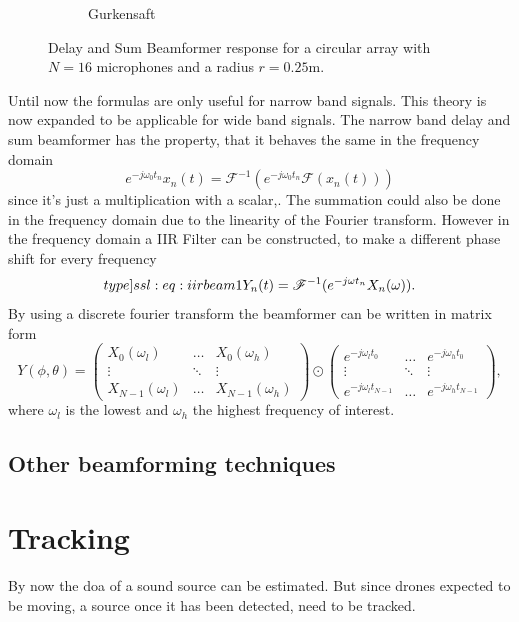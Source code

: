 \begin{figure}[h]
\begin{subfigure}[t]{0.45\textwidth}
		\caption{Gurkensaft} 
		\label{ssl:fig:f_dep1}
	\end{subfigure}
	\caption{Delay and Sum Beamformer response for a circular array with $N=16$ microphones 
	and a radius $r = 0.25$m. }
	\label{ssl:fig:f_deps}
\end{figure}


Until now the formulas are only useful for narrow band signals. 
This theory is now expanded to be applicable for wide band signals.
The narrow band delay and sum beamformer has the property, that it behaves
the same in the frequency domain
\begin{equation}
	e^{-j\omega_0 t_n} x_n(t) = \mathscr{F}^{-1}(e^{-j\omega_0 t_n} \mathscr{F}(x_n(t)))
\end{equation}
since it's just a multiplication with a scalar,. 
The summation could also be done in the frequency domain due to the 
linearity of the Fourier transform.
However in the frequency domain a IIR Filter can be constructed, to 
make a different phase shift for every frequency 
\begin{equation}
	\label[type]{ssl:eq:iirbeam1}
	Y_n(t) = \mathscr{F}^{-1}(e^{-j\omega t_n} X_n(\omega)).
\end{equation}
By using a discrete fourier transform the beamformer can be written
in matrix form
\begin{equation}
	Y(\phi, \theta) = 
	\begin{pmatrix}
		X_0(\omega_l) & \hdots & X_0(\omega_h)\\
		\vdots & \ddots & \vdots \\
		X_{N-1}(\omega_l) & \hdots & X_{N-1}(\omega_h)
	\end{pmatrix}
	\odot
	\begin{pmatrix}
		e^{-j\omega_l t_0} & \hdots & e^{-j\omega_h t_0}\\
		\vdots & \ddots & \vdots \\
		e^{-j\omega_l t_{N-1}} & \hdots & e^{-j\omega_h t_{N-1}}
	\end{pmatrix},
\end{equation}
where $\omega_l$ is the lowest and $\omega_h$ the highest
frequency of interest.

\subsection{Other beamforming techniques}

\section{Tracking}
By now the \acrshort{doa} of a sound source can be estimated.
But since drones expected to be moving, a source once it has been
detected, need to be tracked.

